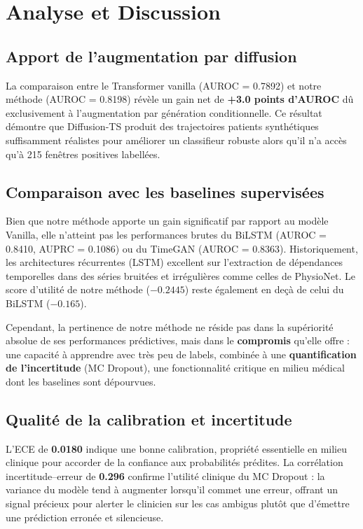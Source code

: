 \documentclass[11pt,a4paper]{article}
\begin{document}

\section{Analyse et Discussion}

\subsection{Apport de l'augmentation par diffusion}

La comparaison entre le Transformer vanilla (AUROC = 0.7892) et notre méthode
(AUROC = 0.8198) révèle un gain net de \textbf{+3.0 points d'AUROC} dû exclusivement à
l'augmentation par génération conditionnelle. Ce résultat démontre que Diffusion-TS
produit des trajectoires patients synthétiques suffisamment réalistes pour améliorer
un classifieur robuste alors qu'il n'a accès qu'à 215 fenêtres positives labellées.

\subsection{Comparaison avec les baselines supervisées}

Bien que notre méthode apporte un gain significatif par rapport au modèle Vanilla, 
elle n'atteint pas les performances brutes du BiLSTM (AUROC = 0.8410, AUPRC = 0.1086) 
ou du TimeGAN (AUROC = 0.8363). Historiquement, les architectures récurrentes (LSTM) 
excellent sur l'extraction de dépendances temporelles dans des séries bruitées et 
irrégulières comme celles de PhysioNet. Le score d'utilité de notre méthode ($-0.2445$) 
reste également en deçà de celui du BiLSTM ($-0.165$).

Cependant, la pertinence de notre méthode ne réside pas dans la supériorité absolue de 
ses performances prédictives, mais dans le \textbf{compromis} qu'elle offre : une capacité 
à apprendre avec très peu de labels, combinée à une \textbf{quantification de l'incertitude} 
(MC Dropout), une fonctionnalité critique en milieu médical dont les baselines sont dépourvues.

\subsection{Qualité de la calibration et incertitude}

L'ECE de \textbf{0.0180} indique une bonne calibration, propriété essentielle
en milieu clinique pour accorder de la confiance aux probabilités prédites. 
La corrélation incertitude--erreur de \textbf{0.296} confirme l'utilité clinique du MC Dropout : 
la variance du modèle tend à augmenter lorsqu'il commet une erreur, offrant un 
signal précieux pour alerter le clinicien sur les cas ambigus plutôt que d'émettre 
une prédiction erronée et silencieuse.
\end{document}

